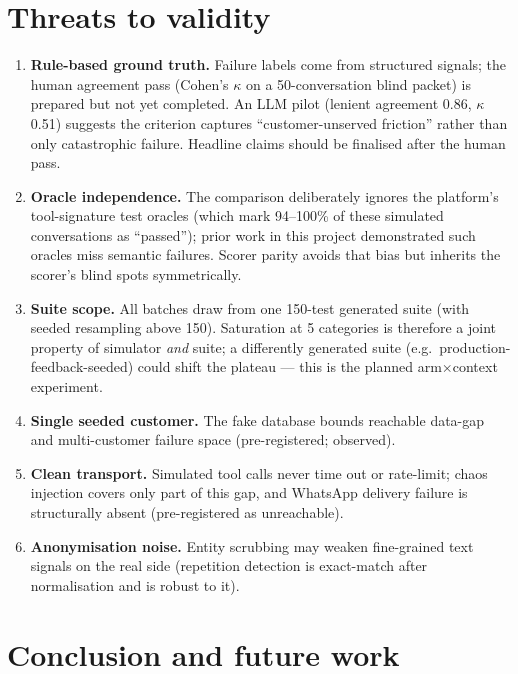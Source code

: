 \documentclass[11pt,a4paper]{article}
\begin{document}
\section{Threats to validity}
\label{sec:threats}

\begin{enumerate}[itemsep=2pt]
\item \textbf{Rule-based ground truth.} Failure labels come from structured signals; the human
      agreement pass (Cohen's $\kappa$ on a 50-conversation blind packet) is prepared but not yet
      completed. An LLM pilot (lenient agreement 0.86, $\kappa$ 0.51) suggests the criterion
      captures ``customer-unserved friction'' rather than only catastrophic failure. Headline
      claims should be finalised after the human pass.
\item \textbf{Oracle independence.} The comparison deliberately ignores the platform's
      tool-signature test oracles (which mark 94--100\% of these simulated conversations as
      ``passed''); prior work in this project demonstrated such oracles miss semantic failures.
      Scorer parity avoids that bias but inherits the scorer's blind spots symmetrically.
\item \textbf{Suite scope.} All batches draw from one 150-test generated suite (with seeded
      resampling above 150). Saturation at 5 categories is therefore a joint property of
      simulator \emph{and} suite; a differently generated suite (e.g.\ production-feedback-seeded)
      could shift the plateau --- this is the planned arm$\times$context experiment.
\item \textbf{Single seeded customer.} The fake database bounds reachable data-gap and
      multi-customer failure space (pre-registered; observed).
\item \textbf{Clean transport.} Simulated tool calls never time out or rate-limit; chaos
      injection covers only part of this gap, and WhatsApp delivery failure is structurally
      absent (pre-registered as unreachable).
\item \textbf{Anonymisation noise.} Entity scrubbing may weaken fine-grained text signals on the
      real side (repetition detection is exact-match after normalisation and is robust to it).
\end{enumerate}

\section{Conclusion and future work}
\end{document}
